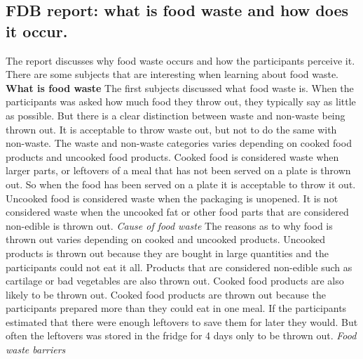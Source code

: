 \subsection{FDB report: what is food waste and how does it occur.}
The report discusses why food waste occurs and how the participants perceive it. There are some subjects that are interesting when learning about food waste. 
\textbf{What is food waste} 
The first subjects discussed what food waste is. When the participants was asked how much food they throw out, they typically say as little as possible. But there is a clear distinction between waste and non-waste being thrown out. It is acceptable to throw waste out, but not to do the same with non-waste. The waste and non-waste categories varies depending on cooked food products and uncooked food products. Cooked food is considered waste when larger parts, or leftovers of a meal that has not been served on a plate is thrown out. So when the food has been served on a plate it is acceptable to throw it out. Uncooked food is considered waste when the packaging is unopened. It is not considered waste when the uncooked fat or other food parts that are considered non-edible is thrown out.
\textit{Cause of food waste} 
The reasons as to why food is thrown out varies depending on cooked and uncooked products. Uncooked products is thrown out because they are bought in large quantities and the participants could not eat it all. Products that are considered non-edible such as cartilage or bad vegetables are also thrown out. Cooked food products are also likely to be thrown out. Cooked food products are thrown out because the participants prepared more than they could eat in one meal. If the participants estimated that there were enough leftovers to save them for later they would. But often the leftovers was stored in the fridge for 4 days only to be thrown out.
\textit{Food waste barriers}
